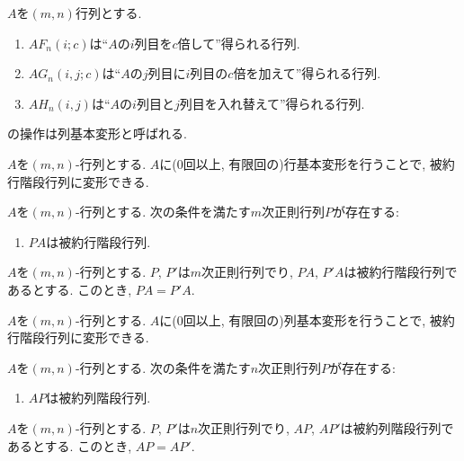\begin{prop}
  \label{prop:coltranformation}
  $A$を$(m,n)$行列とする.
  \begin{enumerate}
  \item $AF_n(i;c)$は``$A$の$i$列目を$c$倍して''得られる行列.
  \item  $AG_n(i,j;c)$は``$A$の$j$列目に$i$列目の$c$倍を加えて''得られる行列.
  \item $AH_n(i,j)$は``$A$の$i$列目と$j$列目を入れ替えて''得られる行列.
  \end{enumerate}
\end{prop}
\begin{remark}
  の操作は列基本変形と呼ばれる.
\end{remark}


\begin{prop}
  $A$を$(m,n)$-行列とする.
  $A$に($0$回以上, 有限回の)行基本変形を行うことで,
  被約行階段行列に変形できる.
\end{prop}

\begin{prop}
  $A$を$(m,n)$-行列とする.
  次の条件を満たす$m$次正則行列$P$が存在する:
  \begin{enumerate}
    \item $PA$は被約行階段行列.
  \end{enumerate}
\end{prop}

\begin{prop}
  $A$を$(m,n)$-行列とする.
  $P$, $P'$は$m$次正則行列でり,
  $PA$, $P'A$は被約行階段行列であるとする.
  このとき, $PA=P'A$.
\end{prop}

\begin{prop}
  $A$を$(m,n)$-行列とする.
  $A$に($0$回以上, 有限回の)列基本変形を行うことで,
  被約行階段行列に変形できる.
\end{prop}

\begin{prop}
  $A$を$(m,n)$-行列とする.
  次の条件を満たす$n$次正則行列$P$が存在する:
  \begin{enumerate}
    \item $AP$は被約列階段行列.
  \end{enumerate}
\end{prop}

\begin{prop}
  $A$を$(m,n)$-行列とする.
  $P$, $P'$は$n$次正則行列でり,
  $AP$, $AP'$は被約列階段行列であるとする.
  このとき, $AP=AP'$.
\end{prop}


